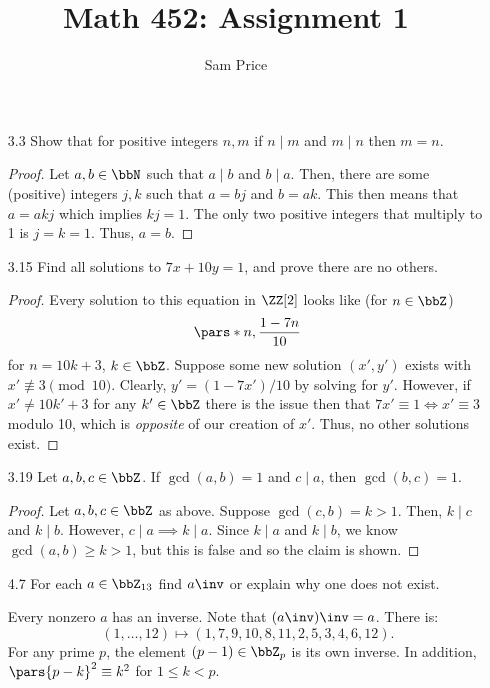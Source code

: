 \documentclass{article}
\author{Sam Price}
\date{}
\title{Math 452: Assignment 1}
\begin{document}
\maketitle

\begin{enumerate}
\item[3.3\rparen] Show that for positive integers $n, m$ if $n \mid m$ and $m \mid n$ then $m = n$.
        \begin{proof}
          Let $a, b \in \bbN$ such that $a \mid b$ and $b \mid a$.
          Then, there are some (positive) integers $j, k$ such that $a = bj$ and $b = ak$.
          This then means that $a = akj$ which implies $kj = 1$.
          The only two positive integers that multiply to 1 is $j = k = 1$.
          Thus, $a = b$.
        \end{proof}

  \item[3.15\rparen] Find all solutions to $7x + 10y = 1$, and prove there are no others.

        \begin{proof}
          Every solution to this equation in $\ZZ[2]$ looks like (for $n \in \bbZ$)
          \[ \pars*{n, \frac{1 - 7n}{10}} \]
          for $n = 10k + 3$, $k \in \bbZ$.
          Suppose some new solution $(x', y')$ exists with $x' \not\equiv 3 \pmod{10}$.
          Clearly, $y' = (1 - 7x')/10$ by solving for $y'$.
          However, if $x' \ne 10k' + 3$ for any $k' \in \bbZ$ there is the issue then that
          $7x' \equiv 1 \iff x' \equiv 3$ modulo 10, which is \emph{opposite} of our creation of $x'$.
          Thus, no other solutions exist.
        \end{proof}

  \item[3.19\rparen] Let $a, b, c \in \bbZ$. If $\gcd(a, b) = 1$ and $c \mid a$, then $\gcd(b, c) = 1$.
        \begin{proof}
          Let $a, b, c \in \bbZ$ as above.
          Suppose $\gcd(c, b) = k > 1$.
          Then, $k \mid c$ and $k \mid b$. However, $c \mid a \implies k \mid a$.
          Since $k \mid a$ and $k \mid b$, we know $\gcd(a, b) \ge k > 1$, but this is false
          and so the claim is shown.
        \end{proof}

  \item[4.7\rparen] For each $a \in \bbZ_{13}$ find $a\inv$ or explain why one does not exist.

        Every nonzero $a$ has an inverse. Note that $(a\inv)\inv = a$. There is:
        \[
        (1, \ldots, 12) \mapsto (1, 7, 9, 10, 8, 11, 2, 5, 3, 4, 6, 12).
        \]
        For any prime $p$, the element $(p - 1) \in \bbZ_{p}$ is its own inverse.
        In addition, $\pars{p - k}^{2} \equiv k^{2}$ for $1 \le k < p$.


\end{enumerate}
\end{document}
